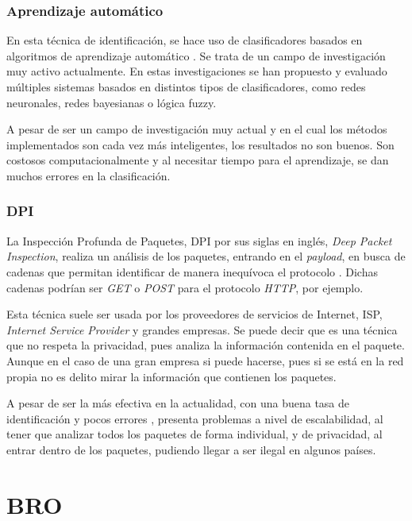 \subsubsection{Aprendizaje automático}

En esta técnica de identificación, se hace uso de clasificadores basados en algoritmos de aprendizaje automático \cite{learning}. Se 
trata de un campo de investigación muy activo actualmente. En estas investigaciones se han propuesto y evaluado múltiples sistemas 
basados en distintos tipos de clasificadores, como redes neuronales, redes bayesianas o lógica fuzzy.

\intro A pesar de ser un campo de investigación muy actual y en el cual los métodos implementados son cada vez más inteligentes, los 
resultados no son buenos. Son costosos computacionalmente y al necesitar tiempo para el aprendizaje, se dan muchos errores en la 
clasificación.

\subsubsection{DPI}

La Inspección Profunda de Paquetes, DPI por sus siglas en inglés, \textit{Deep Packet Inspection}, realiza un análisis de los 
paquetes, entrando en el \textit{payload}, en busca de cadenas que permitan identificar de manera inequívoca el protocolo 
\cite{payload}. Dichas cadenas podrían ser \textit{GET} o \textit{POST} para el protocolo \textit{HTTP}, por ejemplo.

\intro Esta técnica suele ser usada por los proveedores de servicios de Internet, ISP, \textit{Internet Service Provider} y grandes 
empresas. Se puede decir que es una técnica que no respeta la privacidad, pues analiza la información contenida en el paquete. Aunque 
en el caso de una gran empresa si puede hacerse, pues si se está en la red propia no es delito mirar la información que contienen los 
paquetes.

\intro A pesar de ser la más efectiva en la actualidad, con una buena tasa de identificación y pocos errores \cite{dpiaproximacion}, 
presenta problemas a nivel de escalabilidad, al tener que analizar todos los paquetes de forma individual, y de privacidad, al entrar 
dentro de los paquetes, pudiendo llegar a ser ilegal en algunos países.

\section{BRO}

